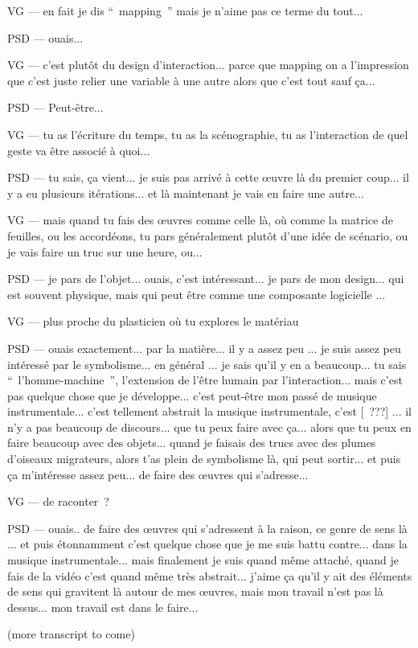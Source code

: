 VG — en fait je dis “ mapping ” mais je n'aime pas ce terme du tout... 

PSD — ouais...  

VG — c'est plutôt du design d'interaction... parce que mapping on a l'impression que c'est juste relier une variable à une autre alors que c'est tout sauf ça... 

PSD — Peut-être... 

VG — tu as l'écriture du temps, tu as la scénographie, tu as l'interaction de quel geste va être associé à quoi... 

PSD — tu sais, ça vient... je suis pas arrivé à cette œuvre là du premier coup... il y a eu plusieurs itérations... et là maintenant je vais en faire une autre... 

VG — mais quand tu fais des œuvres comme celle là, où comme la matrice de feuilles, ou les accordéons, tu pars généralement plutôt d'une idée de scénario, ou je vais faire un truc sur une heure, ou... 

PSD — je pars de l'objet... ouais, c'est intéressant... je pars de mon design... qui est souvent physique, mais qui peut être comme une composante logicielle ... 

VG — plus proche du plasticien où tu explores le matériau 

PSD — ouais exactement... par la matière... il y a assez peu ... je suis assez peu intéressé par le symbolisme... en général ... je sais qu'il y en a beaucoup... tu sais “ l'homme-machine ”,  l'extension de l'être humain par l'interaction... mais c'est pas quelque chose que je développe... c'est peut-être mon passé de musique instrumentale... c'est tellement abstrait la musique instrumentale, c'est [ ???] ... il n'y a pas beaucoup de discours... que tu peux faire avec ça... alors que tu peux en faire beaucoup avec des objets... quand je faisais des trucs avec des plumes d'oiseaux migrateurs, alors t'as plein de symbolisme là, qui peut sortir... et puis ça m'intéresse assez peu... de faire des œuvres qui s'adresse... 

VG — de raconter ? 

PSD — ouais.. de faire des œuvres qui s'adressent à la raison, ce genre de sens là ... et puis étonnamment c'est quelque chose que je me suis battu contre... dans la musique instrumentale... mais finalement je suis quand même attaché, quand je fais de la vidéo c'est quand même très abstrait... j'aime ça qu'il y ait des éléments de sens qui gravitent là autour de mes œuvres, mais mon travail n'est pas là dessus... mon travail est dans le faire... 

(more transcript to come)
